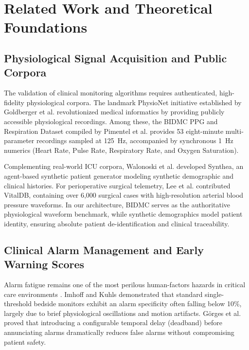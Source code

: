 \documentclass[10pt,journal,compsoc]{IEEEtran}
\begin{document}
\section{Related Work and Theoretical Foundations}
\label{sec:related}

\subsection{Physiological Signal Acquisition and Public Corpora}
The validation of clinical monitoring algorithms requires authenticated, high-fidelity physiological corpora. The landmark PhysioNet initiative established by Goldberger et al. \cite{goldberger2000physiobank} revolutionized medical informatics by providing publicly accessible physiological recordings. Among these, the BIDMC PPG and Respiration Dataset compiled by Pimentel et al. \cite{pimentel2016robust} provides 53 eight-minute multi-parameter recordings sampled at 125~Hz, accompanied by synchronous 1~Hz numerics (Heart Rate, Pulse Rate, Respiratory Rate, and Oxygen Saturation). 

Complementing real-world ICU corpora, Walonoski et al. \cite{walonoski2018synthea} developed Synthea, an agent-based synthetic patient generator modeling synthetic demographic and clinical histories. For perioperative surgical telemetry, Lee et al. \cite{lee2022vitaldb} contributed VitalDB, containing over 6,000 surgical cases with high-resolution arterial blood pressure waveforms. In our architecture, BIDMC serves as the authoritative physiological waveform benchmark, while synthetic demographics model patient identity, ensuring absolute patient de-identification and clinical traceability.

\subsection{Clinical Alarm Management and Early Warning Scores}
Alarm fatigue remains one of the most perilous human-factors hazards in critical care environments \cite{xu2025alarm}. Imhoff and Kuhls \cite{imhoff2006alarm} demonstrated that standard single-threshold bedside monitors exhibit an alarm specificity often falling below 10\%, largely due to brief physiological oscillations and motion artifacts. Görges et al. \cite{gorges2009delay} proved that introducing a configurable temporal delay (deadband) before annunciating alarms dramatically reduces false alarms without compromising patient safety. 
\end{document}

